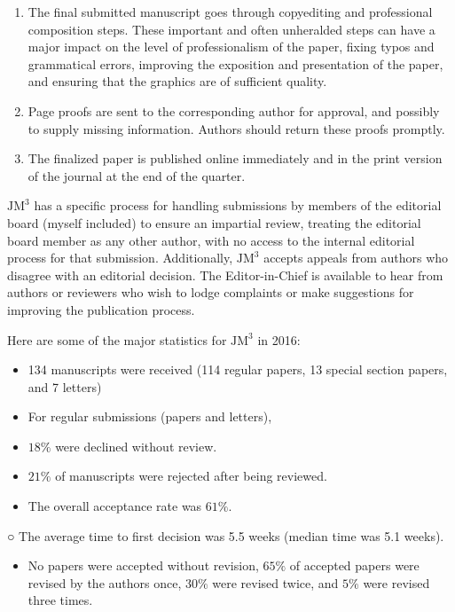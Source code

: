 \begin{enumerate}
  \item The final submitted manuscript goes through copyediting and professional composition steps. These important and often unheralded steps can have a major impact on the level of professionalism of the paper, fixing typos and grammatical errors, improving the exposition and presentation of the paper, and ensuring that the graphics are of sufficient quality.

  \item Page proofs are sent to the corresponding author for approval, and possibly to supply missing information. Authors should return these proofs promptly.

  \item The finalized paper is published online immediately and in the print version of the journal at the end of the quarter.

\end{enumerate}

$\mathrm{JM}^{3}$ has a specific process for handling submissions by members of the editorial board (myself included) to ensure an impartial review, treating the editorial board member as any other author, with no access to the internal editorial process for that submission. Additionally, $\mathrm{JM}^{3}$ accepts appeals from authors who disagree with an editorial decision. The Editor-in-Chief is available to hear from authors or reviewers who wish to lodge complaints or make suggestions for improving the publication process.

Here are some of the major statistics for $\mathrm{JM}^{3}$ in 2016:

\begin{itemize}
  \item 134 manuscripts were received (114 regular papers, 13 special section papers, and 7 letters)
  \item For regular submissions (papers and letters),
  \item $18 \%$ were declined without review.
  \item $21 \%$ of manuscripts were rejected after being reviewed.
  \item The overall acceptance rate was $61 \%$.
\end{itemize}

○ The average time to first decision was 5.5 weeks (median time was 5.1 weeks).

\begin{itemize}
  \item No papers were accepted without revision, $65 \%$ of accepted papers were revised by the authors once, $30 \%$ were revised twice, and $5 \%$ were revised three times.
\end{itemize}

